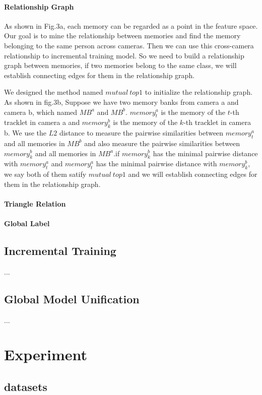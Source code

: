 \documentclass{article}
\begin{document}
\paragraph{Relationship Graph}As shown in Fig.3a, each memory can be regarded as a point in the feature space. Our goal is to mine the relationship between memories and find the memory belonging to the same person across cameras. Then we can use this cross-camera relationship to incremental training model. So we need to build a relationship graph between memories, if two memories belong to the same class, we will establish connecting edges for them in the relationship graph.


We designed the method named $mutual \ top1$ to initialize the relationship graph. As shown in fig.3b, Suppose we have two memory banks from camera a and camera b, which named $MB^{a}$ and $MB^{b}$. $memory_{t}^{a}$ is the memory of the $t$-th tracklet in camera a and $memory_{k}^{b}$ is the memory of the $k$-th tracklet in camera b. We use the $L2$ distance to measure the pairwise similarities between $memory_{t}^{a}$ and all memories in $MB^{b}$ and also measure the pairwise similarities between $memory_{k}^{b}$ and all memories in $MB^{a}$.if $memory_{k}^{b}$ has the  minimal pairwise distance with $memory_{t}^{a}$ and  $memory_{t}^{a}$ has the minimal pairwise distance with $memory_{k}^{b}$, we say both of them satify $mutual \ top1$ and we will establish connecting edges for them in the relationship graph.


\paragraph{Triangle Relation}

\paragraph{Global Label}

\subsection{Incremental Training}
...
\subsection{Global Model Unification}
...
\section{Experiment}
\subsection{datasets}
\end{document}
